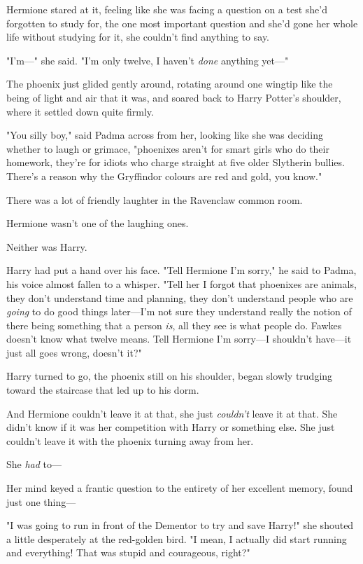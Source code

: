 Hermione stared at it, feeling like she was facing a question on a test she'd
forgotten to study for, the one most important question and she'd gone her
whole life without studying for it, she couldn't find anything to say.

"I'm—" she said. "I'm only twelve, I haven't \emph{done} anything yet—"

The phoenix just glided gently around, rotating around one wingtip like the
being of light and air that it was, and soared back to Harry Potter's shoulder,
where it settled down quite firmly.

"You silly boy," said Padma across from her, looking like she was deciding
whether to laugh or grimace, "phoenixes aren't for smart girls who do their
homework, they're for idiots who charge straight at five older Slytherin
bullies. There's a reason why the Gryffindor colours are red and gold, you know."

There was a lot of friendly laughter in the Ravenclaw common room.

Hermione wasn't one of the laughing ones.

Neither was Harry.

Harry had put a hand over his face. "Tell Hermione I'm sorry," he said to
Padma, his voice almost fallen to a whisper. "Tell her I forgot that phoenixes
are animals, they don't understand time and planning, they don't understand
people who are \emph{going} to do good things later—I'm not sure they
understand really the notion of there being something that a person \emph{is},
all they see is what people do. Fawkes doesn't know what twelve means. Tell
Hermione I'm sorry—I shouldn't have—it just all goes wrong, doesn't it?"

Harry turned to go, the phoenix still on his shoulder, began slowly trudging
toward the staircase that led up to his dorm.

And Hermione couldn't leave it at that, she just \emph{couldn't} leave it at
that. She didn't know if it was her competition with Harry or something else.
She just couldn't leave it with the phoenix turning away from her.

She \emph{had} to—

Her mind keyed a frantic question to the entirety of her excellent memory,
found just one thing—

"I was going to run in front of the Dementor to try and save Harry!" she
shouted a little desperately at the red-golden bird. "I mean, I actually did
start running and everything! That was stupid and courageous, right?"

